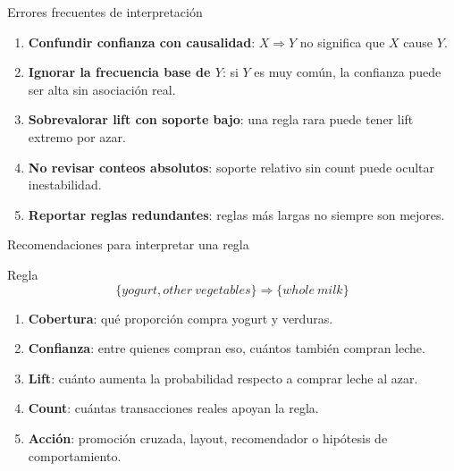 \documentclass[10pt,aspectratio=169]{beamer}
\begin{document}
\begin{frame}{Errores frecuentes de interpretación}
\begin{enumerate}
  \item \textbf{Confundir confianza con causalidad}: $X \Rightarrow Y$ no significa que $X$ cause $Y$.
  \item \textbf{Ignorar la frecuencia base de $Y$}: si $Y$ es muy común, la confianza puede ser alta sin asociación real.
  \item \textbf{Sobrevalorar lift con soporte bajo}: una regla rara puede tener lift extremo por azar.
  \item \textbf{No revisar conteos absolutos}: soporte relativo sin count puede ocultar inestabilidad.
  \item \textbf{Reportar reglas redundantes}: reglas más largas no siempre son mejores.
\end{enumerate}
\end{frame}

\begin{frame}{Recomendaciones para interpretar una regla}
\begin{exampleblock}{Regla}
\[
\{yogurt, other\ vegetables\} \Rightarrow \{whole\ milk\}
\]
\end{exampleblock}

\begin{enumerate}
  \item \textbf{Cobertura}: qué proporción compra yogurt y verduras.
  \item \textbf{Confianza}: entre quienes compran eso, cuántos también compran leche.
  \item \textbf{Lift}: cuánto aumenta la probabilidad respecto a comprar leche al azar.
  \item \textbf{Count}: cuántas transacciones reales apoyan la regla.
  \item \textbf{Acción}: promoción cruzada, layout, recomendador o hipótesis de comportamiento.
\end{enumerate}
\end{frame}
\end{document}
